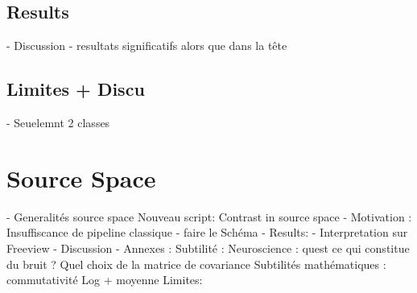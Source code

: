 
\subsection{Results}
- Discussion
- resultats significatifs alors que dans la tête


\subsection{Limites + Discu}

- Seuelemnt 2 classes

\section{Source Space}

- Generalités source space
Nouveau script: Contrast in source space
- Motivation : Insuffiscance de pipeline classique
- faire le Schéma
- Results:
- Interpretation sur Freeview
- Discussion
- Annexes : Subtilité :
Neuroscience : quest ce qui constitue du bruit ? Quel choix de la matrice de covariance
Subtilités mathématiques :  commutativité Log + moyenne
Limites:
